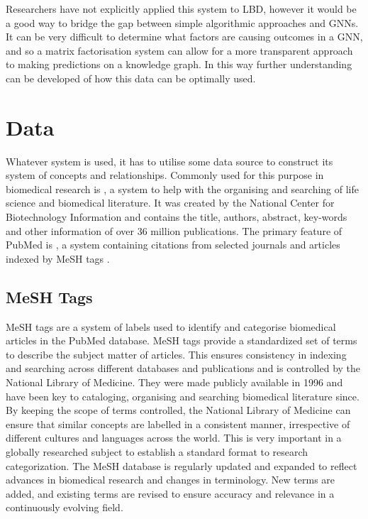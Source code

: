 \documentclass{l4proj}
\begin{document}
Researchers have not explicitly applied this system to LBD, however it would be a good way to bridge the gap between simple algorithmic approaches and GNNs. It can be very difficult to determine what factors are causing outcomes in a GNN, and so a matrix factorisation system can allow for a more transparent approach to making predictions on a knowledge graph. In this way further understanding can be developed of how this data can be optimally used. \\ 

\section{Data}

Whatever system is used, it has to utilise some data source to construct its system of concepts and relationships. Commonly used for this purpose in biomedical research is \cite{pubmed}, a system to help with the organising and searching of life science and biomedical literature. It was created by the National Center for Biotechnology Information and contains the title, authors, abstract, key-words and other information of over 36 million publications. The primary feature of PubMed is \cite{medline}, a system containing citations from selected journals and articles indexed by MeSH tags \citep{mesh_home}. \\

\subsection{MeSH Tags}

MeSH tags are a system of labels used to identify and categorise biomedical articles in the PubMed database. MeSH tags provide a standardized set of terms to describe the subject matter of articles. This ensures consistency in indexing and searching across different databases and publications and is controlled by the National Library of Medicine. They were made publicly available in 1996 and have been key to cataloging, organising and searching biomedical literature since. By keeping the scope of terms controlled, the National Library of Medicine can ensure that similar concepts are labelled in a consistent manner, irrespective of different cultures and languages across the world. This is very important in a globally researched subject to establish a standard format to research categorization. The MeSH database is regularly updated and expanded to reflect advances in biomedical research and changes in terminology. New terms are added, and existing terms are revised to ensure accuracy and relevance in a continuously evolving field. \\
\end{document}
